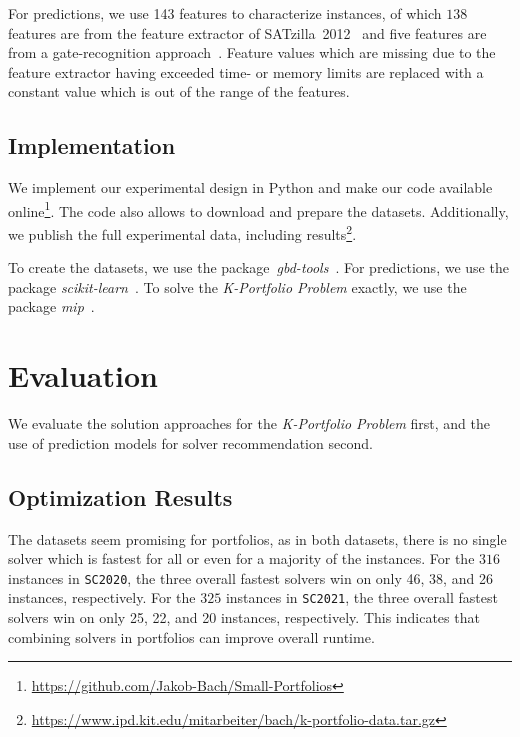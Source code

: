 \documentclass[conference]{IEEEtran}
\begin{document}
For predictions, we use 143 features to characterize instances, of which $138$ features are from the feature extractor of SATzilla~2012~\cite{xu2008satzilla, xu2012satzilla2012} and five features are from a gate-recognition approach~\cite{Iser:2015:GateRecognition}. 
Feature values which are missing due to the feature extractor having exceeded time- or memory limits are replaced with a constant value which is out of the range of the features.

\subsection{Implementation}

We implement our experimental design in Python and make our code available online\footnote{\url{https://github.com/Jakob-Bach/Small-Portfolios}}.
The code also allows to download and prepare the datasets.
Additionally, we publish the full experimental data, including results\footnote{\url{https://www.ipd.kit.edu/mitarbeiter/bach/k-portfolio-data.tar.gz}}.

To create the datasets, we use the package~\emph{gbd-tools}~\cite{iser2020collaborative}.
For predictions, we use the package \emph{scikit-learn}~\cite{scikit-learn}.
To solve the \emph{K-Portfolio Problem} exactly, we use the package \emph{mip}~\cite{python-mip}.

\section{Evaluation}
\label{sec:evaluation}

We evaluate the solution approaches for the \emph{K-Portfolio Problem} first, and the use of prediction models for solver recommendation second.

\subsection{Optimization Results}

The datasets seem promising for portfolios, as in both datasets, there is no single solver which is fastest for all or even for a majority of the instances.
For the $316$ instances in \texttt{SC2020}, the three overall fastest solvers win on only 46, 38, and 26 instances, respectively.
For the $325$ instances in \texttt{SC2021}, the three overall fastest solvers win on only 25, 22, and 20 instances, respectively.
This indicates that combining solvers in portfolios can improve overall runtime.
\end{document}
